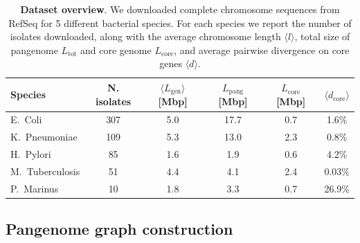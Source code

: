 \documentclass[aps,rmp,reprint,superscriptaddress,notitlepage,10pt,onecolumn]{revtex4-1}
\newcommand{\avg}[1]{\langle #1 \rangle}
\begin{document}
\begin{table}[hb]
    \setlength{\tabcolsep}{9pt}
    \begin{tabular}{lccccc}
        \hline\hline
        Species         & N. isolates & $\avg{L_\text{gen}}$ [Mbp] & $L_\text{pang}$ [Mbp] & $L_\text{core}$ [Mbp] & $\avg{d_\text{core}}$ \\
        \hline
        E.~Coli         & 307         & 5.0                        & 17.7                  & 0.7                   & 1.6\%                 \\
        K.~Pneumoniae   & 109         & 5.3                        & 13.0                  & 2.3                   & 0.8\%                 \\
        H.~Pylori       & 85          & 1.6                        & 1.9                   & 0.6                   & 4.2\%                 \\
        M.~Tuberculosis & 51          & 4.4                        & 4.1                   & 2.4                   & 0.03\%                \\
        P.~Marinus      & 10          & 1.8                        & 3.3                   & 0.7                   & 26.9\%                \\
        \hline
    \end{tabular}
    \caption{{\bf Dataset overview}. We downloaded complete chromosome sequences from RefSeq for 5 different bacterial species. For each species we report the number of isolates downloaded, along with the average chromosome length $\avg{l}$, total size of pangenome  $L_\text{tot}$ and core genome $L_\text{core}$, and average pairwise divergence on core genes $\avg{d}$.}
    \label{table:panx-dataset-updated}
\end{table}


\subsection{Pangenome graph construction}
\end{document}
